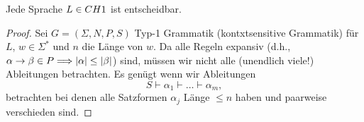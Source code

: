 \begin{Satz}
 Jede Sprache $L\in CH{1}$ ist entscheidbar.
\end{Satz}

\begin{proof}
 Sei $G=(\Sigma,N,P,S)$ Typ-1 Grammatik (kontxtsensitive Grammatik) für $L$, $w\in\Sigma^*$ und $n$ die Länge von $w$.
 Da alle Regeln expansiv (d.h., $\alpha\->\beta\in P \==> |\alpha|\leq |\beta|$) sind, 
 müssen wir nicht alle (unendlich viele!) Ableitungen betrachten.
 Es genügt wenn wir Ableitungen
 $$S\vdash\alpha_1\vdash \ldots \vdash\alpha_m,$$
 betrachten bei denen alle Satzformen $\alpha_j$ Länge $\leq n$ haben und paarweise verschieden sind.
\end{proof}









